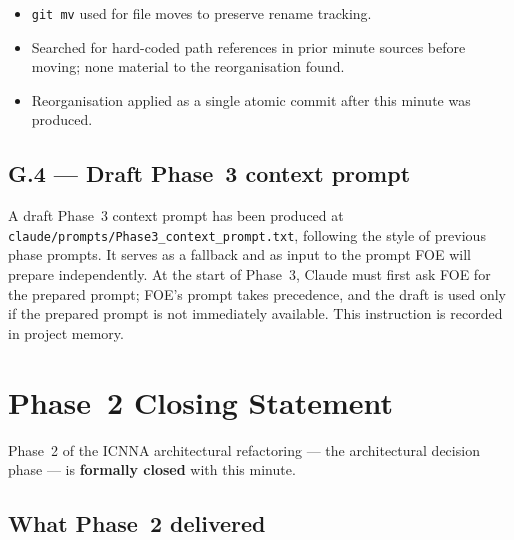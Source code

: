 \documentclass[11pt,a4paper]{article}
\begin{document}
\begin{itemize}
    \item \texttt{git mv} used for file moves to preserve rename tracking.
    \item Searched for hard-coded path references in prior minute sources before moving; none material to the reorganisation found.
    \item Reorganisation applied as a single atomic commit after this minute was produced.
\end{itemize}

\subsection{G.4 --- Draft Phase~3 context prompt}

A draft Phase~3 context prompt has been produced at \texttt{claude/prompts/Phase3\_context\_prompt.txt}, following the style of previous phase prompts. It serves as a fallback and as input to the prompt FOE will prepare independently. At the start of Phase~3, Claude must first ask FOE for the prepared prompt; FOE's prompt takes precedence, and the draft is used only if the prepared prompt is not immediately available. This instruction is recorded in project memory.

\section{Phase~2 Closing Statement}

Phase~2 of the ICNNA architectural refactoring --- the architectural decision phase --- is \textbf{formally closed} with this minute.

\subsection{What Phase~2 delivered}
\end{document}

